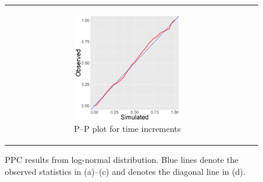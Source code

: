 \documentclass[ba]{imsart}
\numberwithin{equation}{section}
\theoremstyle{plain}
\begin{document}
\begin{figure}[!t]
\begin{tabular}[t]{cc}
\begin{subfigure}[b]{0.495\textwidth}
			\end{subfigure}
			\begin{subfigure}[b]{0.495\textwidth}
				\centering
				\caption{P--P plot for time increments}
				\includegraphics[width=0.56\textwidth]{img/timePPplot-1.png}	
			\end{subfigure}
		\end{tabular}
		\caption {PPC results from log-normal distribution. Blue lines denote the observed statistics in (a)--(c) and denotes the diagonal line in (d).}
		\label{figure:PPCresults}
	\end{figure}
	
\end{document}
